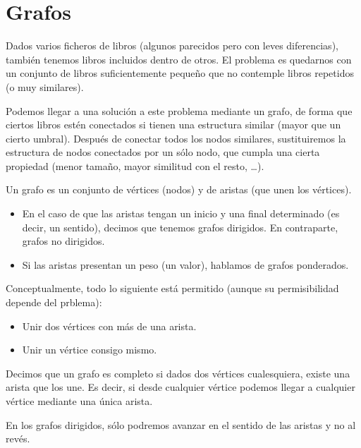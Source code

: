 
\section{Grafos}
\begin{ejemplo}
    Dados varios ficheros de libros (algunos parecidos pero con leves diferencias), también tenemos libros incluidos dentro de otros. El problema es quedarnos con un conjunto de libros suficientemente pequeño que no contemple libros repetidos (o muy similares).

    Podemos llegar a una solución a este problema mediante un grafo, de forma que ciertos libros estén conectados si tienen una estructura similar (mayor que un cierto umbral). Después de conectar todos los nodos similares, sustituiremos la estructura de nodos conectados por un sólo nodo, que cumpla una cierta propiedad (menor tamaño, mayor similitud con el resto, \ldots).
\end{ejemplo}

\begin{definicion}[Grafo]
    Un grafo es un conjunto de vértices (nodos) y de aristas (que unen los vértices).
\end{definicion}
\begin{itemize}
    \item En el caso de que las aristas tengan un inicio y una final determinado (es decir, un sentido), decimos que tenemos grafos dirigidos. En contraparte, grafos no dirigidos.
    \item Si las aristas presentan un peso (un valor), hablamos de grafos ponderados.
\end{itemize}

Conceptualmente, todo lo siguiente está permitido (aunque su permisibilidad depende del prblema):
\begin{itemize}
    \item Unir dos vértices con más de una arista.
    \item Unir un vértice consigo mismo.
\end{itemize}

\begin{definicion}
    Decimos que un grafo es completo si dados dos vértices cualesquiera, existe una arista que los une. Es decir, si desde cualquier vértice podemos llegar a cualquier vértice mediante una única arista.
\end{definicion}
En los grafos dirigidos, sólo podremos avanzar en el sentido de las aristas y no al revés.

